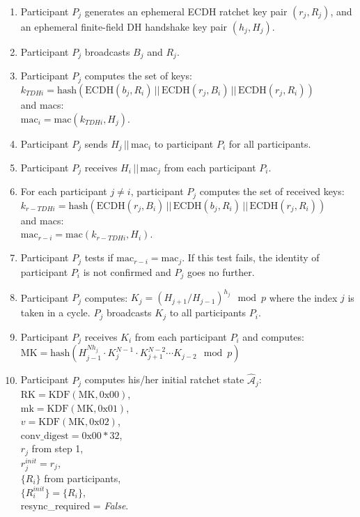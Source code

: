 \documentclass[%
preprint,
amsmath,amssymb,
aps,
prb,
floatfix,
]{revtex4-1}
\begin{document}
\begin{enumerate}
\item Participant $P_j$ generates an ephemeral ECDH ratchet key pair $(r_j,
R_j)$, and an ephemeral finite-field DH handshake key pair $(h_j, H_j)$.
\item Participant $P_j$ broadcasts $B_j$ and $R_j$.
\item Participant $P_j$ computes the set of keys: \\ $k_{TDHi} =
\mathrm{hash}(\mathrm{ECDH}(b_j, R_i) \, ||
\, \mathrm{ECDH}(r_j, B_i) \, || \, \mathrm{ECDH}(r_j, R_i))$ \\ and macs: \\
$\mathrm{mac}_i = \mathrm{mac}(k_{TDHi}, H_j)$.
\item Participant $P_j$ sends $H_j \, || \, \mathrm{mac}_i$ to participant $P_i$ for all
participants.
\item Participant $P_j$ receives $H_i \, || \, \mathrm{mac}_j$ from each
participant $P_i$.
\item For each participant $j \ne i$, participant $P_j$ computes the set of received keys:\\ $k_{r-TDHi} =
\mathrm{hash}(\mathrm{ECDH}(r_j, B_i) \, ||
\, \mathrm{ECDH}(b_j, R_i) \, || \, \mathrm{ECDH}(r_j, R_i))$ \\ and macs: \\
$\mathrm{mac}_{r-i} = \mathrm{mac}(k_{r-TDHi}, H_i)$.
\item Participant $P_j$ tests if $\mathrm{mac}_{r-i} = \mathrm{mac}_j$. If this
test fails, the identity of participant $P_i$ is not confirmed and $P_j$ goes no
further.
\item Participant $P_j$ computes: $K_j = (H_{j+1}/H_{j-1})^{h_j} \mod p$ where the
index $j$ is taken in a cycle. $P_j$ broadcasts $K_j$ to all participants $P_i$.
\item Participant $P_j$ receives $K_i$ from each participant $P_i$ and
computes:\\ $\mathrm{MK} = \mathrm{hash}(H_{j-1}^{ N h_j} \cdot K_j^{N-1} \cdot
K_{j+1}^{N-2} \cdots K_{j-2} \mod p )$
\item Participant $P_j$ computes his/her initial ratchet state
$\mathcal{\hat{A}}_j$:\\
$\mathrm{RK} = \mathrm{KDF}(\mathrm{MK}, 0\mathrm{x}00)$, \\
$\mathrm{mk} = \mathrm{KDF}(\mathrm{MK}, 0\mathrm{x}01)$, \\
$v = \mathrm{KDF}(\mathrm{MK}, 0\mathrm{x}02)$, \\
$\mathrm{conv\_digest} = 0\mathrm{x}00 * 32$, \\
$r_j$ from step 1, \\
$r_j^{init} = r_j$, \\
$\{R_i\}$ from participants, \\
$\{R_i^{init}\} = \{R_i\}$, \\
resync\_required = \textit{False}.
\end{enumerate}
\end{document}
